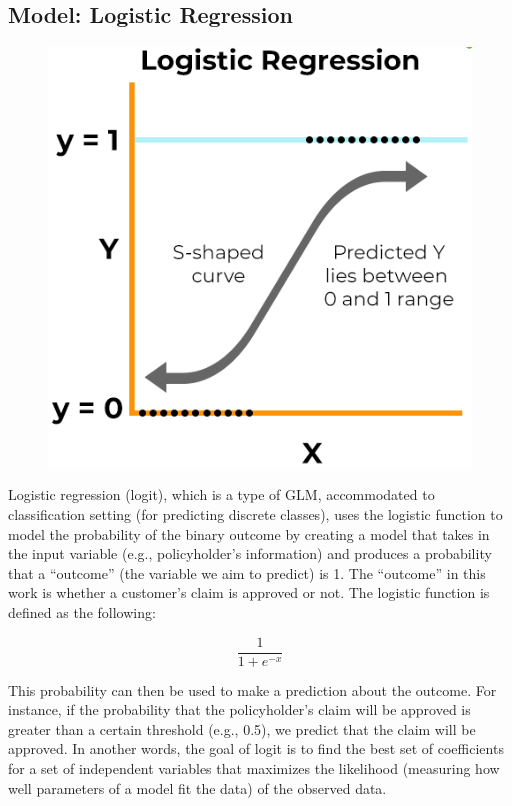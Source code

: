 \documentclass{article}
\begin{document}
\hypertarget{model-logistic-regression}{%
\subsection{\texorpdfstring{Model: Logistic Regression
\label{subsec:model-logit}}{Model: Logistic Regression }}\label{model-logistic-regression}}

\begin{figure}
\includegraphics[width=0.9\linewidth]{./figures/logit-model.png}
\end{figure}

Logistic regression (logit), which is a type of GLM, accommodated to
classification setting (for predicting discrete classes), uses the
logistic function to model the probability of the binary outcome by
creating a model that takes in the input variable (e.g., policyholder's
information) and produces a probability that a ``outcome'' (the variable
we aim to predict) is 1. The ``outcome'' in this work is whether a
customer's claim is approved or not. The logistic function is defined as
the following:

\[\frac{1}{1 + e^{-x}}\]

This probability can then be used to make a prediction about the
outcome. For instance, if the probability that the policyholder's claim
will be approved is greater than a certain threshold (e.g., 0.5), we
predict that the claim will be approved. In another words, the goal of
logit is to find the best set of coefficients for a set of independent
variables that maximizes the likelihood (measuring how well parameters
of a model fit the data) of the observed data.
\end{document}
